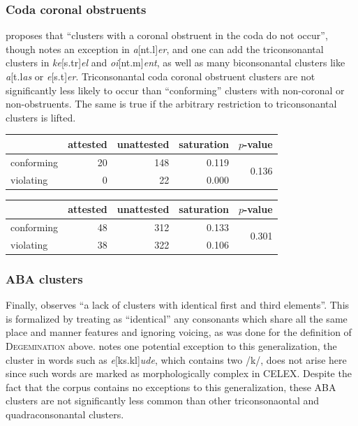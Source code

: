 \subsubsection{Coda coronal obstruents}

\citet[][175]{Pierrehumbert1994} proposes that ``clusters with a coronal obstruent in the coda do not occur'', though \citet{Pierrehumbert1994} notes an exception in \emph{a}[nt.l]\emph{er}, and one can add the triconsonantal clusters in \emph{ke}[s.tr]\emph{el} and \emph{oi}[nt.m]\emph{ent}, as well as many biconsonantal clusters like \emph{a}[t.l\emph{as} or \emph{e}[s.t]\emph{er}. Triconsonantal coda coronal obstruent clusters are not significantly less likely to occur than ``conforming'' clusters with non-coronal or non-obstruents. The same is true if the arbitrary restriction to triconsonantal clusters is lifted.

\begin{example}
\begin{tabular}{l r r r r}
\toprule
           & attested & unattested & saturation & $p$-value              \\
\midrule
conforming & 20       & 148        & 0.119      & \multirow{2}{*}{0.136} \\
violating  & 0        & 22         & 0.000                               \\
\bottomrule
\end{tabular}
\end{example}

\begin{example}
\begin{tabular}{l r r r r}
\toprule
           & attested & unattested & saturation & $p$-value              \\
\midrule
conforming & 48       & 312        & 0.133      & \multirow{2}{*}{0.301} \\
violating  & 38       & 322        & 0.106                               \\
\bottomrule
\end{tabular}
\end{example}

\subsubsection{ABA clusters}

Finally, \citet[][176]{Pierrehumbert1994} observes ``a lack of clusters with identical first and third elements''. This is formalized by treating as ``identical'' any consonants which share all the same place and manner features and ignoring voicing, as was done for the definition of \textsc{Degemination} above. \citeauthor{Pierrehumbert1994} notes one potential exception to this generalization, the cluster in words such as \emph{e}[ks.kl]\emph{ude}, which contains two /k/, does not arise here since such words are marked as morphologically complex in CELEX. Despite the fact that the corpus contains no exceptions to this generalization, these \textsc{ABA} clusters are not significantly less common than other triconsonaontal and quadraconsonantal clusters.

